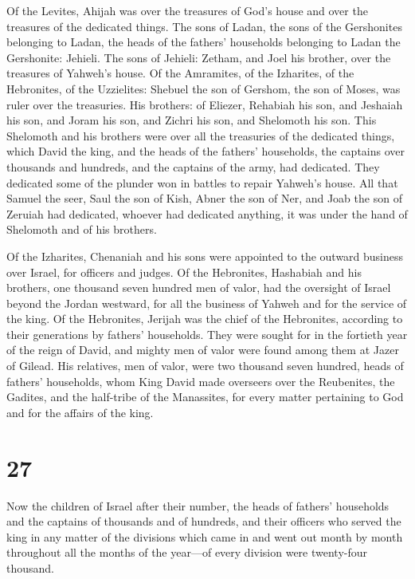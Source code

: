  Of the Levites, Ahijah was over the treasures of God's
house and over the treasures of the dedicated things. 
The sons of Ladan, the sons of the Gershonites belonging to Ladan, the
heads of the fathers' households belonging to Ladan the Gershonite:
Jehieli.  The sons of Jehieli: Zetham, and Joel his
brother, over the treasures of Yahweh's house.  Of the
Amramites, of the Izharites, of the Hebronites, of the Uzzielites:
 Shebuel the son of Gershom, the son of Moses, was ruler
over the treasuries.  His brothers: of Eliezer, Rehabiah
his son, and Jeshaiah his son, and Joram his son, and Zichri his son,
and Shelomoth his son.  This Shelomoth and his brothers
were over all the treasuries of the dedicated things, which David the
king, and the heads of the fathers' households, the captains over
thousands and hundreds, and the captains of the army, had dedicated.
 They dedicated some of the plunder won in battles to
repair Yahweh's house.  All that Samuel the seer, Saul
the son of Kish, Abner the son of Ner, and Joab the son of Zeruiah had
dedicated, whoever had dedicated anything, it was under the hand of
Shelomoth and of his brothers.

 Of the Izharites, Chenaniah and his sons were appointed
to the outward business over Israel, for officers and judges.
 Of the Hebronites, Hashabiah and his brothers, one
thousand seven hundred men of valor, had the oversight of Israel beyond
the Jordan westward, for all the business of Yahweh and for the service
of the king.  Of the Hebronites, Jerijah was the chief of
the Hebronites, according to their generations by fathers' households.
They were sought for in the fortieth year of the reign of David, and
mighty men of valor were found among them at Jazer of Gilead.
 His relatives, men of valor, were two thousand seven
hundred, heads of fathers' households, whom King David made overseers
over the Reubenites, the Gadites, and the half-tribe of the Manassites,
for every matter pertaining to God and for the affairs of the king.

\hypertarget{section-26}{%
\section{27}\label{section-26}}

 Now the children of Israel after their number, the heads
of fathers' households and the captains of thousands and of hundreds,
and their officers who served the king in any matter of the divisions
which came in and went out month by month throughout all the months of
the year---of every division were twenty-four thousand.

